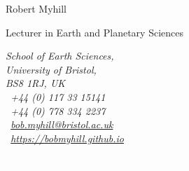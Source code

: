 \documentclass[11pt,twoside,a4paper]{article}
\date{}
\title{}
\newcommand*{\mobilesymbol}{\Mobilefone~}
\newcommand*{\phonesymbol}{\Telefon~}
\newcommand*{\emailsymbol}{\Letter~}
\newcommand*{\homepagesymbol}{{\Large\ComputerMouse}~}
\begin{document}

\vspace{-5em}

\begin{center}
\begin{minipage}[b]{0.53\textwidth}
  \raggedright
  \Huge{Robert Myhill} \par
  \LARGE{\color{color1} Lecturer in Earth and Planetary Sciences} \par
  \vspace{0.5em}
\end{minipage}%
\begin{minipage}[b]{0.33\textwidth}
  \raggedleft
  \scriptsize \it \color{gray}
  School of Earth Sciences, \\
  University of Bristol, \\
  BS8 1RJ, UK\\
  \phonesymbol +44 (0) 117 33 15141 \\
  \mobilesymbol +44 (0) 778 334 2237 \\
  \emailsymbol \href{mailto:bob.myhill@bristol.ac.uk}{bob.myhill@bristol.ac.uk} \\
  \homepagesymbol \url{https://bobmyhill.github.io}\\
\end{minipage}%
\begin{minipage}[b]{0.02\textwidth}
  \raggedleft \textcolor{white}{.}
\end{minipage}%
\begin{minipage}[b]{0.12\textwidth}
  \raggedleft
      {%
        \color{color1}
        \setlength{\fboxsep}{1.pt}%
        \setlength{\fboxrule}{0.8pt}%
}
\end{minipage}
\end{center}
\end{document}
